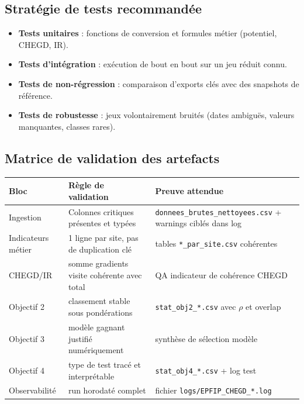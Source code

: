 \documentclass[11pt,a4paper]{article}
\begin{document}
\subsection{Strat\'egie de tests recommand\'ee}
\begin{itemize}[leftmargin=1.2cm]
  \item \textbf{Tests unitaires} : fonctions de conversion et formules m\'etier (potentiel, CHEGD, IR).
  \item \textbf{Tests d'int\'egration} : ex\'ecution de bout en bout sur un jeu r\'eduit connu.
  \item \textbf{Tests de non-r\'egression} : comparaison d'exports cl\'es avec des snapshots de r\'ef\'erence.
  \item \textbf{Tests de robustesse} : jeux volontairement bruit\'es (dates ambiguës, valeurs manquantes, classes rares).
\end{itemize}

\subsection{Matrice de validation des artefacts}
\begin{center}\begin{tabular}{p{}p{}p{}}
\toprule
\textbf{Bloc} & \textbf{Règle de validation} & \textbf{Preuve attendue} \\
\midrule
Ingestion & Colonnes critiques pr\'esentes et typ\'ees & \texttt{donnees\_brutes\_nettoyees.csv} + warnings cibl\'es dans log \\
Indicateurs m\'etier & 1 ligne par site, pas de duplication cl\'e & tables \texttt{*\_par\_site.csv} coh\'erentes \\
CHEGD/IR & somme gradients visite coh\'erente avec total & QA indicateur de coh\'erence CHEGD \\
Objectif 2 & classement stable sous pond\'erations & \texttt{stat\_obj2\_*.csv} avec $\rho$ et overlap \\
Objectif 3 & modèle gagnant justifi\'e num\'eriquement & synthèse de s\'election modèle \\
Objectif 4 & type de test trac\'e et interpr\'etable & \texttt{stat\_obj4\_*.csv} + log test \\
Observabilit\'e & run horodat\'e complet & fichier \texttt{logs/EPFIP\_CHEGD\_*.log} \\
\bottomrule
\end{tabular}\end{center}
\end{document}
